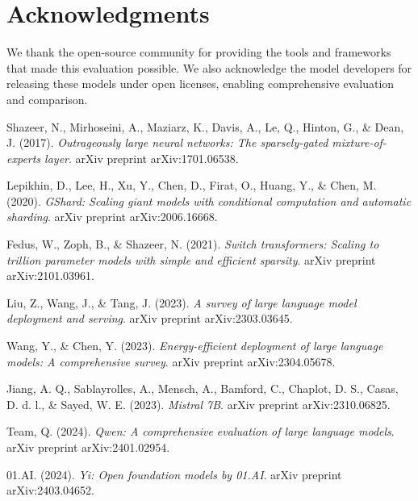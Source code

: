 \documentclass[11pt]{article}
\begin{document}
\section*{Acknowledgments}

We thank the open-source community for providing the tools and frameworks that made this evaluation possible. We also acknowledge the model developers for releasing these models under open licenses, enabling comprehensive evaluation and comparison.


\begin{thebibliography}{9}

Shazeer, N., Mirhoseini, A., Maziarz, K., Davis, A., Le, Q., Hinton, G., \& Dean, J. (2017).
\textit{Outrageously large neural networks: The sparsely-gated mixture-of-experts layer}.
arXiv preprint arXiv:1701.06538.

Lepikhin, D., Lee, H., Xu, Y., Chen, D., Firat, O., Huang, Y., \& Chen, M. (2020).
\textit{GShard: Scaling giant models with conditional computation and automatic sharding}.
arXiv preprint arXiv:2006.16668.

Fedus, W., Zoph, B., \& Shazeer, N. (2021).
\textit{Switch transformers: Scaling to trillion parameter models with simple and efficient sparsity}.
arXiv preprint arXiv:2101.03961.

Liu, Z., Wang, J., \& Tang, J. (2023).
\textit{A survey of large language model deployment and serving}.
arXiv preprint arXiv:2303.03645.

Wang, Y., \& Chen, Y. (2023).
\textit{Energy-efficient deployment of large language models: A comprehensive survey}.
arXiv preprint arXiv:2304.05678.

Jiang, A. Q., Sablayrolles, A., Mensch, A., Bamford, C., Chaplot, D. S., Casas, D. d. l., \& Sayed, W. E. (2023).
\textit{Mistral 7B}.
arXiv preprint arXiv:2310.06825.

Team, Q. (2024).
\textit{Qwen: A comprehensive evaluation of large language models}.
arXiv preprint arXiv:2401.02954.

01.AI. (2024).
\textit{Yi: Open foundation models by 01.AI}.
arXiv preprint arXiv:2403.04652.

\end{thebibliography}
\end{document}
